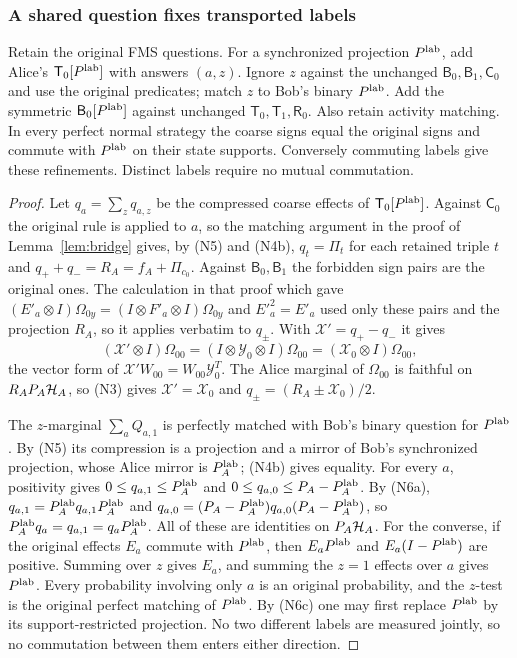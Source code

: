 \subsubsection{A shared question fixes transported labels}
\begin{lemma}\label{lem:label}
Retain the original FMS questions. For a synchronized projection $P^{\rm lab}$, add Alice's $\mathsf T_0[P^{\rm lab}]$ with answers $(a,z)$. Ignore $z$ against the unchanged $\mathsf B_0,\mathsf B_1,\mathsf C_0$ and use the original predicates; match $z$ to Bob's binary $P^{\rm lab}$. Add the symmetric $\mathsf B_0[P^{\rm lab}]$ against unchanged $\mathsf T_0,\mathsf T_1,\mathsf R_0$. Also retain activity matching. In every perfect normal strategy the coarse signs equal the original signs and commute with $P^{\rm lab}$ on their state supports. Conversely commuting labels give these refinements. Distinct labels require no mutual commutation.
\end{lemma}
\begin{proof}
Let $q_a=\sum_zq_{a,z}$ be the compressed coarse effects of $\mathsf T_0[P^{\rm lab}]$. Against $\mathsf C_0$ the original rule is applied to $a$, so the matching argument in the proof of Lemma~\ref{lem:bridge} gives, by (N5) and (N4b), $q_t=\Pi_t$ for each retained triple $t$ and $q_++q_-=R_A=f_A+\Pi_{c_0}$. Against $\mathsf B_0,\mathsf B_1$ the forbidden sign pairs are the original ones. The calculation in that proof which gave $(E'_a\otimes I)\Omega_{0y}=(I\otimes F'_a\otimes I)\Omega_{0y}$ and $E'^2_a=E'_a$ used only these pairs and the projection $R_A$, so it applies verbatim to $q_\pm$. With $\mathcal X'=q_+-q_-$ it gives
\[
 (\mathcal X'\otimes I)\Omega_{00}=(I\otimes\mathcal Y_0\otimes I)\Omega_{00}=(\mathcal X_0\otimes I)\Omega_{00},
\]
the vector form of $\mathcal X'W_{00}=W_{00}\mathcal Y_0^T$. The Alice marginal of $\Omega_{00}$ is faithful on $R_AP_A\mathcal H_A$, so (N3) gives $\mathcal X'=\mathcal X_0$ and $q_\pm=(R_A\pm\mathcal X_0)/2$.

The $z$-marginal $\sum_aQ_{a,1}$ is perfectly matched with Bob's binary question for $P^{\rm lab}$. By (N5) its compression is a projection and a mirror of Bob's synchronized projection, whose Alice mirror is $P^{\rm lab}_A$; (N4b) gives equality. For every $a$, positivity gives $0\leq q_{a,1}\leq P^{\rm lab}_A$ and $0\leq q_{a,0}\leq P_A-P^{\rm lab}_A$. By (N6a), $q_{a,1}=P^{\rm lab}_Aq_{a,1}P^{\rm lab}_A$ and $q_{a,0}=(P_A-P^{\rm lab}_A)q_{a,0}(P_A-P^{\rm lab}_A)$, so $P^{\rm lab}_Aq_a=q_{a,1}=q_aP^{\rm lab}_A$. All of these are identities on $P_A\mathcal H_A$. For the converse, if the original effects $E_a$ commute with $P^{\rm lab}$, then $E_aP^{\rm lab}$ and $E_a(I-P^{\rm lab})$ are positive. Summing over $z$ gives $E_a$, and summing the $z=1$ effects over $a$ gives $P^{\rm lab}$. Every probability involving only $a$ is an original probability, and the $z$-test is the original perfect matching of $P^{\rm lab}$. By (N6c) one may first replace $P^{\rm lab}$ by its support-restricted projection. No two different labels are measured jointly, so no commutation between them enters either direction.
\end{proof}

